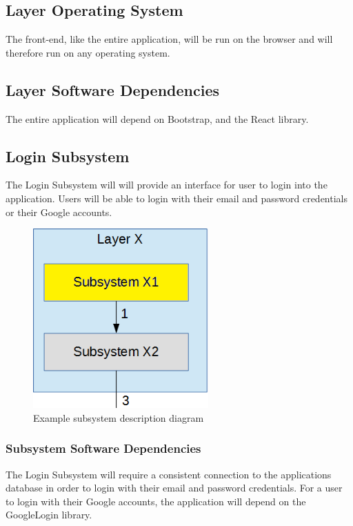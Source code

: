 \subsection{Layer Operating System}
The front-end, like the entire application, will be run on the browser and will therefore run on any operating system.

\subsection{Layer Software Dependencies}
The entire application will depend on Bootstrap, and the React library.

\subsection{Login Subsystem}
The Login Subsystem will will provide an interface for user to login into the application. Users will be able to login with their email and password credentials or their Google accounts.

\begin{figure}[h!]
	\centering
 	\includegraphics[width=0.60\textwidth]{images/subsystem}
 \caption{Example subsystem description diagram}
\end{figure}

\subsubsection{Subsystem Software Dependencies}
The Login Subsystem will require a consistent connection to the applications database in order to login with their email and password credentials. For a user to login with their Google accounts, the application will depend on the GoogleLogin library.

